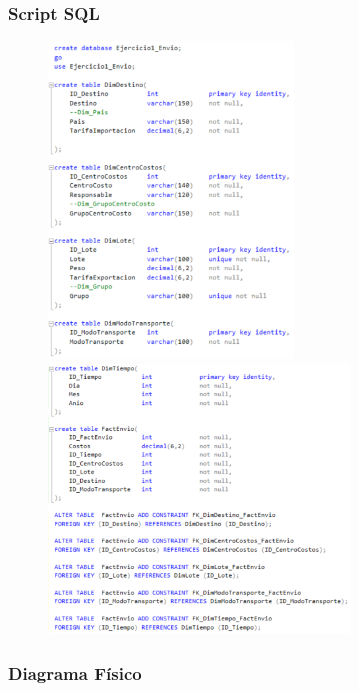 \documentclass[12pt,letterpaper]{article}
\begin{document}
\subsubsection{\textbf{Script SQL }}

	\begin{figure}[htb]
		\begin{center}
			\includegraphics[width=6.5cm]{./Imagenes/Ejercicio1_script1}
			\includegraphics[width=8cm]{./Imagenes/Ejercicio1_script2}
		\end{center}
	\end{figure}
\newpage

\subsubsection{\textbf{Diagrama Físico }}
\end{document}
